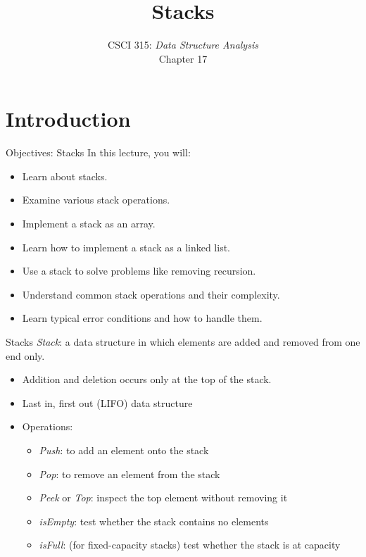 \documentclass[14pt,aspectratio=1610]{beamer}
\title{\Huge{} Stacks}
\subtitle{CSCI 315: \textit{Data Structure Analysis}\\Chapter 17}
\institute{Charleston Southern University}
\begin{document}
\begin{frame}
  \titlepage{}
\end{frame}

\section{Introduction}

\begin{frame}{Objectives: Stacks}
In this lecture, you will:
\begin{itemize}
\item
  Learn about stacks.
\item
  Examine various stack operations.
\item
  Implement a stack as an array.
\item
  Learn how to implement a stack as a linked list.
\item
  Use a stack to solve problems like removing recursion.
\item
  Understand common stack operations and their complexity.
\item
  Learn typical error conditions and how to handle them.
\end{itemize}
\end{frame}

\begin{frame}{Stacks}
\emph{Stack}: a data structure in which elements are added and removed from one end only.

\begin{itemize}
\item
  Addition and deletion occurs only at the top of the stack.
\item
  Last in, first out (LIFO) data structure
\item
  Operations:
  \begin{itemize}
  \item
    \emph{Push}: to add an element onto the stack
  \item
    \emph{Pop}: to remove an element from the stack
  \item 
    \emph{Peek} or \emph{Top}: inspect the top element without removing it
  \item
    \emph{isEmpty}: test whether the stack contains no elements
  \item
    \emph{isFull}: (for fixed-capacity stacks) test whether the stack is at capacity
  \end{itemize}
\end{itemize}
\end{frame}
\end{document}
